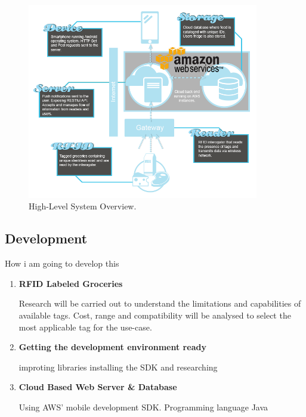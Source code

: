 \documentclass[a4paper, 11pt]{article}
\begin{document}
{  \vspace{\baselineskip}
\begin{figure}[h!]
  \centering
    \includegraphics[width=0.9\textwidth]{system6.png}
      \caption{High-Level System Overview.}
\end{figure}

\subsection{Development}
How i am going to develop this


\begin{enumerate}
   \item \textbf{RFID Labeled Groceries}
   	\begin{flushleft}Research will be carried out to understand the limitations and capabilities of available tags. Cost, range and compatibility will be analysed to select the most applicable tag for the use-case.
  	\end{flushleft}
	  \vspace{\baselineskip}

   \item \textbf{Getting the development environment ready}
   	\begin{flushleft}improting libraries installing the SDK and researching
  	\end{flushleft}
  
   \item \textbf{Cloud Based Web Server \& Database}
   	\begin{flushleft}Using AWS' mobile development SDK. Programming language Java
  	\end{flushleft}
  

\end{enumerate}}
\end{document}
